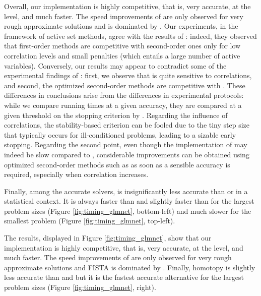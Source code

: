  Overall, our implementation is highly competitive, that is, very accurate, at
 the  level, and much faster.  The speed improvements of
  are only observed for very rough approximate solutions and
  is dominated by . 
 Our experiments, in the framework of active set methods, agree with the results of
 \citet{2012_FML_Bach}: indeed, they observed that first-order methods are
 competitive with second-order ones only for low correlation levels and
 small penalties (which entails a large number of active variables).
 Conversely, our results may appear to contradict some of the experimental
 findings of \citet{2009_JSS_Friedman}: first, we observe that 
 is quite sensitive to correlations, and second, the optimized second-order
 methods are competitive with .
 These differences in conclusions arise from the differences in experimental
 protocols: while we compare running times at a given accuracy, they are compared
 at a given threshold on the stopping criterion by \citet{2009_JSS_Friedman}.
 Regarding the influence of correlations, the stability-based criterion can be
 fooled due to the tiny step size that typically occurs for ill-conditioned
 problems, leading to a sizable early stopping.
 Regarding the second point, even though the  implementation of
  may indeed be slow compared to , considerable
 improvements can be obtained using optimized second-order methods such as 
  as soon as a sensible accuracy is required, especially
 when correlation increases.
 
 Finally, among the accurate solvers,  is insignificantly
 less accurate than  or  in a statistical
 context.  It is always faster than  and slightly faster than
  for the largest problem sizes (Figure
 \ref{fig:timing_glmnet}, bottom-left) and much slower for the smallest problem
 (Figure \ref{fig:timing_glmnet}, top-left).

%
\else
 The results, displayed in Figure  \ref{fig:timing_glmnet}, show that our
 implementation is highly competitive, that is, very accurate, at the  
 level, and much faster.  The speed improvements of  
 are only observed for very rough approximate solutions and
  FISTA is dominated by .
  Finally,  homotopy is slightly less accurate than
    and  but  it is the fastest accurate
  alternative for the largest problem sizes (Figure  \ref{fig:timing_glmnet}, right). 

